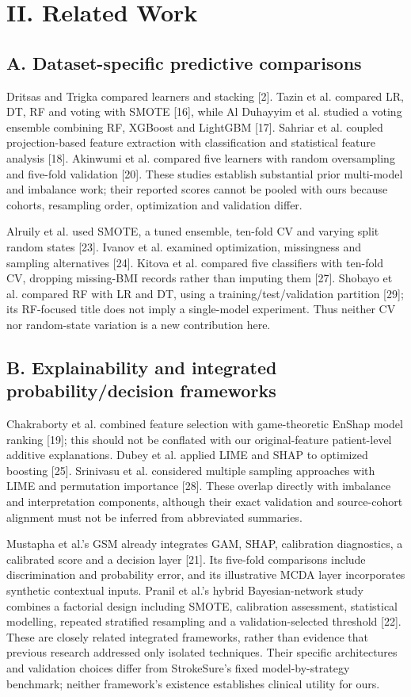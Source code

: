 \documentclass[10pt,twocolumn,letterpaper]{article}
\begin{document}
\section*{II. Related Work}
\subsection*{A. Dataset-specific predictive comparisons}
Dritsas and Trigka compared learners and stacking [2]. Tazin et al. compared LR, DT, RF and voting with SMOTE [16], while Al Duhayyim et al. studied a voting ensemble combining RF, XGBoost and LightGBM [17]. Sahriar et al. coupled projection-based feature extraction with classification and statistical feature analysis [18]. Akinwumi et al. compared five learners with random oversampling and five-fold validation [20]. These studies establish substantial prior multi-model and imbalance work; their reported scores cannot be pooled with ours because cohorts, resampling order, optimization and validation differ.


Alruily et al. used SMOTE, a tuned ensemble, ten-fold CV and varying split random states [23]. Ivanov et al. examined optimization, missingness and sampling alternatives [24]. Kitova et al. compared five classifiers with ten-fold CV, dropping missing-BMI records rather than imputing them [27]. Shobayo et al. compared RF with LR and DT, using a training/test/validation partition [29]; its RF-focused title does not imply a single-model experiment. Thus neither CV nor random-state variation is a new contribution here.


\subsection*{B. Explainability and integrated probability/decision frameworks}
Chakraborty et al. combined feature selection with game-theoretic EnShap model ranking [19]; this should not be conflated with our original-feature patient-level additive explanations. Dubey et al. applied LIME and SHAP to optimized boosting [25]. Srinivasu et al. considered multiple sampling approaches with LIME and permutation importance [28]. These overlap directly with imbalance and interpretation components, although their exact validation and source-cohort alignment must not be inferred from abbreviated summaries.


Mustapha et al.'s GSM already integrates GAM, SHAP, calibration diagnostics, a calibrated score and a decision layer [21]. Its five-fold comparisons include discrimination and probability error, and its illustrative MCDA layer incorporates synthetic contextual inputs. Pranil et al.'s hybrid Bayesian-network study combines a factorial design including SMOTE, calibration assessment, statistical modelling, repeated stratified resampling and a validation-selected threshold [22]. These are closely related integrated frameworks, rather than evidence that previous research addressed only isolated techniques. Their specific architectures and validation choices differ from StrokeSure's fixed model-by-strategy benchmark; neither framework's existence establishes clinical utility for ours.
\end{document}
